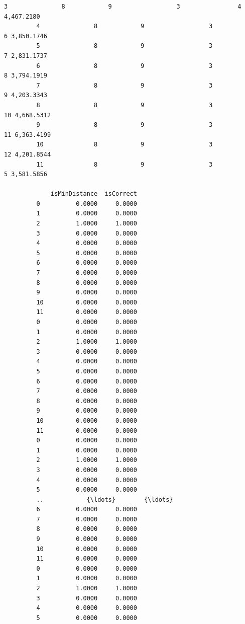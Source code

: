 \documentclass[11pt]{article}
\begin{document}
\begin{Verbatim}[commandchars=\\\{\}]
         3               8            9                  3                4 4,467.2180   
         4               8            9                  3                6 3,850.1746   
         5               8            9                  3                7 2,831.1737   
         6               8            9                  3                8 3,794.1919   
         7               8            9                  3                9 4,203.3343   
         8               8            9                  3               10 4,668.5312   
         9               8            9                  3               11 6,363.4199   
         10              8            9                  3               12 4,201.8544   
         11              8            9                  3                5 3,581.5856   
         
             isMinDistance  isCorrect  
         0          0.0000     0.0000  
         1          0.0000     0.0000  
         2          1.0000     1.0000  
         3          0.0000     0.0000  
         4          0.0000     0.0000  
         5          0.0000     0.0000  
         6          0.0000     0.0000  
         7          0.0000     0.0000  
         8          0.0000     0.0000  
         9          0.0000     0.0000  
         10         0.0000     0.0000  
         11         0.0000     0.0000  
         0          0.0000     0.0000  
         1          0.0000     0.0000  
         2          1.0000     1.0000  
         3          0.0000     0.0000  
         4          0.0000     0.0000  
         5          0.0000     0.0000  
         6          0.0000     0.0000  
         7          0.0000     0.0000  
         8          0.0000     0.0000  
         9          0.0000     0.0000  
         10         0.0000     0.0000  
         11         0.0000     0.0000  
         0          0.0000     0.0000  
         1          0.0000     0.0000  
         2          1.0000     1.0000  
         3          0.0000     0.0000  
         4          0.0000     0.0000  
         5          0.0000     0.0000  
         ..            {\ldots}        {\ldots}  
         6          0.0000     0.0000  
         7          0.0000     0.0000  
         8          0.0000     0.0000  
         9          0.0000     0.0000  
         10         0.0000     0.0000  
         11         0.0000     0.0000  
         0          0.0000     0.0000  
         1          0.0000     0.0000  
         2          1.0000     1.0000  
         3          0.0000     0.0000  
         4          0.0000     0.0000  
         5          0.0000     0.0000  

\end{Verbatim}
\end{document}
